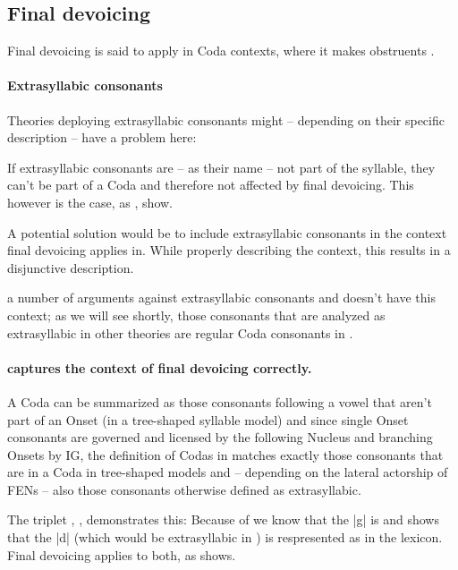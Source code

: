\subsection{Final devoicing}

Final devoicing is said to apply in Coda contexts,
where it makes obstruents .

\paragraph{Extrasyllabic consonants}
Theories deploying extrasyllabic consonants might
-- depending on their specific description --
have a problem here:

If extrasyllabic consonants are -- as their name  --
not part of the syllable, they can't be part of a Coda
and therefore not affected by final devoicing.
This however  is the case,
as  \ti{[ma:kt]},  \ti{[ja:kt]} show.

A potential solution would be to include extrasyllabic
consonants in the context final devoicing applies in.
While properly describing the context, this results
in a disjunctive description.

\cite{scheer2004}  a number of arguments
against extrasyllabic consonants and \CVCV doesn't
have this context; as we will see shortly, those
consonants that are analyzed as extrasyllabic in other
theories are regular Coda consonants in \CVCV.

\paragraph{\CVCV captures the context of final devoicing correctly.}
A Coda can be summarized as those consonants following
a vowel that aren't part of an Onset
(in a tree-shaped syllable model) and since single Onset
consonants are governed and licensed by the following
Nucleus and branching Onsets by \gls{IG},
the definition of Codas in \CVCV matches exactly those
consonants that are in a Coda in tree-shaped models
and -- depending on the lateral actorship of \glspl{FEN} --
also those consonants otherwise defined as extrasyllabic.

The triplet , , 
demonstrates this: Because of  we know
that the |g| is  and  shows
that the |d| (which would be extrasyllabic in )
is respresented as  in the lexicon.
Final devoicing applies to both, as \ti{[ja:kt]} shows.

